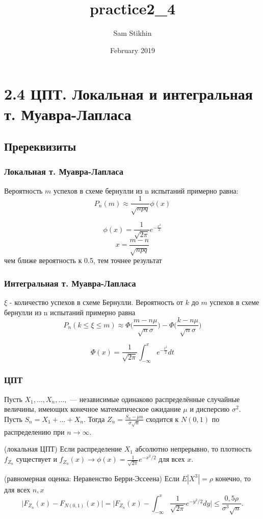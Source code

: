 \documentclass[a4paper, 14pt]{extarticle}
\title{practice2_4}
\author{Sam Stikhin}
\date{February 2019}
\begin{document}
\section*{2.4 ЦПТ. Локальная и интегральная т. Муавра-Лапласа}
\subsection*{Пререквизиты}
\subsubsection*{Локальная т. Муавра-Лапласа} 
Вероятность $m$ успехов в схеме бернулли из n испытаний примерно равна:
$$P_n(m)  \approx \frac{1}{\sqrt{npq}} \phi(x)$$

$$\phi(x) = \frac{1}{\sqrt{2\pi}}e^{-\frac{x^2}{2}}$$
$$x = \frac{m - n}{\sqrt{npq}}$$
чем ближе вероятность к 0.5, тем точнее результат 


\subsubsection*{Интегральная т. Муавра-Лапласа}
$\xi$ - количество успехов в схеме Бернулли. Вероятность от $k$ до $m$ успехов в схеме бернулли из n испытаний примерно равна
$$P_n(k\leq \xi \leq m)  \approx  \Phi\Big(\frac{m-n\mu}{\sqrt{n}\sigma}\Big) - \Phi\Big(\frac{k-n\mu}{\sqrt{n}\sigma}\Big)$$

$$\Phi(x) = \frac{1}{\sqrt{2\pi}}\int_{-\infty}^{x}e^{-\frac{t^2}{2}}dt$$



\subsubsection*{ЦПТ}
Пусть $X_1, \dots , X_n,  \dots ,$  --- независимые одинаково распределённые случайные величины, имеющих конечное математическое ожидание $\mu$ и дисперсию $\sigma^{2}$. Пусть $S_n={X_1+ \dots  +X_n}.$ Тогда $Z_n=\frac{S_n-\mu n}{\sigma\sqrt{n}}$ сходится к $N(0,1)$ по распределению при $n\to\infty.$

(локальная ЦПТ) Если распределение $X_1$ абсолютно непрерывно, то плотность $f_{Z_n}$ существует и $f_{Z_n}(x)\to \phi(x)=\frac{1}{\sqrt{2\pi}}e^{-x^2/2}$ для всех $x.$

(равномерная оценка: Неравенство Берри-Эссеена) Если $E |X^3|=\rho$ конечно, то для всех $n,x$ $$\Big|F_{Z_n}(x)-F_{N(0,1)}(x)\Big|=\bigg|F_{Z_n}(x)-\int_{-\infty}^{x}\frac{1}{\sqrt{2\pi}}e^{-y^2/2}dy\bigg|\leq \frac{0,5 \rho}{\sigma^3 \sqrt{n}}.$$
	
\end{document}
